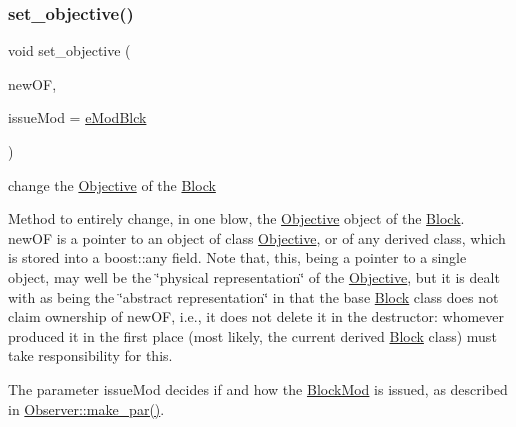 \subsubsection{\texorpdfstring{set\+\_\+objective()}{set\_objective()}}
{\footnotesize\ttfamily void set\+\_\+objective (\begin{DoxyParamCaption}\item[{ObjF \&}]{new\+OF,  }\item[{\mbox{\hyperlink{group___modification___t_y_p_e_s_ga544246d8c462e9a2d817c2c30797968f}{c\+\_\+\+Mod\+Param}}}]{issue\+Mod = {\ttfamily \mbox{\hyperlink{group___modification___t_y_p_e_s_gga48fddcdd03a03f49b7e389ca1ed938d4a21b14b26b1c0093a0905f6fc010bad29}{e\+Mod\+Blck}}} }\end{DoxyParamCaption})}



change the \mbox{\hyperlink{class_s_m_spp__di__unipi__it_1_1_objective}{Objective}} of the \mbox{\hyperlink{class_s_m_spp__di__unipi__it_1_1_block}{Block}} 

Method to entirely change, in one blow, the \mbox{\hyperlink{class_s_m_spp__di__unipi__it_1_1_objective}{Objective}} object of the \mbox{\hyperlink{class_s_m_spp__di__unipi__it_1_1_block}{Block}}. new\+OF is a pointer to an object of class \mbox{\hyperlink{class_s_m_spp__di__unipi__it_1_1_objective}{Objective}}, or of any derived class, which is stored into a boost\+::any field. Note that, this, being a pointer to a single object, may well be the \char`\"{}physical
representation\char`\"{} of the \mbox{\hyperlink{class_s_m_spp__di__unipi__it_1_1_objective}{Objective}}, but it is dealt with as being the \char`\"{}abstract representation\char`\"{} in that the base \mbox{\hyperlink{class_s_m_spp__di__unipi__it_1_1_block}{Block}} class does not claim ownership of new\+OF, i.\+e., it does not delete it in the destructor\+: whomever produced it in the first place (most likely, the current derived \mbox{\hyperlink{class_s_m_spp__di__unipi__it_1_1_block}{Block}} class) must take responsibility for this.

The parameter issue\+Mod decides if and how the \mbox{\hyperlink{class_s_m_spp__di__unipi__it_1_1_block_mod}{Block\+Mod}} is issued, as described in \mbox{\hyperlink{class_s_m_spp__di__unipi__it_1_1_observer_a2d499ae38e5e95cf66cd71da32b0694a}{Observer\+::make\+\_\+par()}}. \mbox{\label{class_s_m_spp__di__unipi__it_1_1_block_a40a2bbe11fbdf470e474f6638fefa66f}} 

